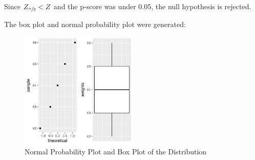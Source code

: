     Since $Z_{\sfrac{\alpha}{2}} < Z$ and the p-score was under 0.05, the null hypothesis is rejected.

    The box plot and normal probability plot were generated:

        \begin{figure}[ht]
            \begin{center}
                \includegraphics[width=0.5\textwidth]{figures/part3.png}
                \caption{Normal Probability Plot and Box Plot of the Distribution} \label{fig:part3}
            \end{center}
        \end{figure}
